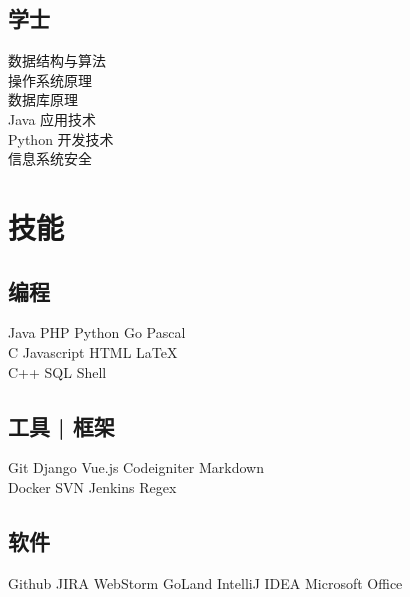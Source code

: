 \documentclass[]{deedy-resume-openfont}
\begin{document}
\begin{minipage}[t]{0.25\textwidth}
\subsection{学士}
数据结构与算法 \\
操作系统原理 \\ 
数据库原理 \\
Java 应用技术 \\
Python 开发技术 \\
信息系统安全 \\


\section{技能}
\sectionsep
\subsection{编程}
Java \textbullet{} PHP \textbullet{} Python \textbullet{} Go \textbullet{} Pascal\\
C \textbullet{} Javascript \textbullet{} HTML \textbullet{} \LaTeX\ \\
C++ \textbullet{} SQL \textbullet{} Shell \\ 
\sectionsep

\subsection{工具 | 框架}
Git \textbullet{} Django \textbullet{} Vue.js \textbullet{} Codeigniter \textbullet{} Markdown \\
Docker  \textbullet{} SVN \textbullet{} Jenkins \textbullet{} Regex\\
\sectionsep

\subsection{软件}
Github \textbullet{} JIRA \textbullet{} WebStorm \textbullet{} GoLand \textbullet{} IntelliJ IDEA \textbullet{} Microsoft Office

%
%

\end{minipage} 
\hfill
\end{document}
